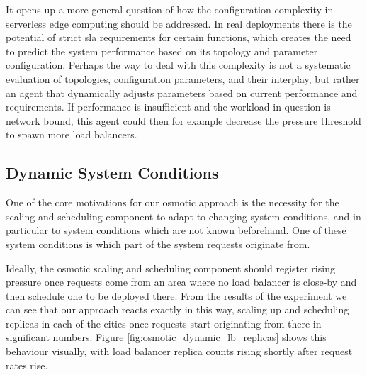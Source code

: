 It opens up a more general question of how the configuration complexity in serverless edge computing should be addressed.
In real deployments there is the potential of strict \gls{sla} requirements for certain functions, which creates the need to predict the system performance based on its topology and parameter configuration.
Perhaps the way to deal with this complexity is not a systematic evaluation of topologies,  configuration parameters, and their interplay, but rather an agent that dynamically adjusts parameters based on current performance and requirements.
If performance is insufficient and the workload in question is network bound, 
this agent could then for example decrease the pressure threshold to spawn more load balancers.




\subsection{Dynamic System Conditions}
One of the core motivations for our osmotic approach is the necessity for the scaling and scheduling component to adapt to changing system conditions, and in particular to system conditions which are not known beforehand.
One of these system conditions is which part of the system requests originate from.

Ideally, the osmotic scaling and scheduling component should register rising pressure once requests come from an area where no load balancer is close-by and then schedule one to be deployed there.
From the results of the experiment we can see that our approach reacts exactly in this way, scaling up and scheduling replicas in each of the cities once requests start originating from there in significant numbers.
Figure \ref{fig:osmotic_dynamic_lb_replicas} shows this behaviour visually, with load balancer replica counts rising shortly after request rates rise.

